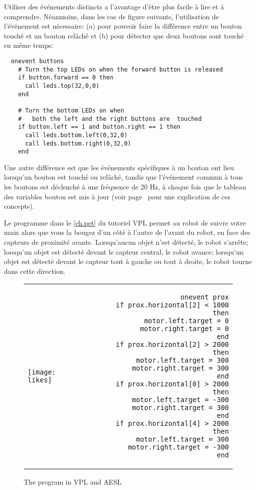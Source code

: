 Utiliser des événements distincts a l'avantage d'être plus facile à lire et à comprendre.
Néanmoins, dans les cas de figure suivants, l'utilisation de l'événement  est nécessaire:
(a) pour pouvoir faire la différence entre un bouton touché et un bouton relâché
et
(b) pour détecter que deux boutons sont touché en même temps:

\begin{footnotesize}
\begin{verbatim}
  onevent buttons
    # Turn the top LEDs on when the forward button is released
    if button.forward == 0 then
      call leds.top(32,0,0)
    end

    # Turn the bottom LEDs on when
    #   both the left and the right buttons are  touched
    if button.left == 1 and button.right == 1 then
      call leds.bottom.left(0,32,0)
      call leds.bottom.right(0,32,0)
    end
\end{verbatim}
\end{footnotesize}

Une autre différence est que les événements spécifiques à un bouton
ont lieu lorsqu'un bouton est touché ou relâché,
tandis que l'événement commun à tous les boutons est déclenché à une fréquence de 20 Hz,
à chaque fois que le tableau des variables bouton est mis à jour (voir page~\pageref{pg.hz}
pour une explication de ces concepts).


Le programme  dans le \cref{ch.pet} du tutoriel VPL
permet au robot de suivre votre main alors que vous la bougez d'un côté à l'autre de l'avant du robot,
en face des capteurs de proximité avants.
Lorsqu'aucun objet n'est détecté, le robot s'arrête;
lorsqu'un objet est détecté devant le capteur central, le robot avance;
lorsqu'un objet est détecté devant le capteur tout à gauche ou tout à droite,
le robot tourne dans cette direction.

\begin{figure}[hbt]
\begin{center}
\begin{tabular}{lr}
\texttt{[image: likes]} &
\begin{minipage}[b]{.4\textwidth}
\begin{footnotesize}
\begin{verbatim}
  onevent prox
    if prox.horizontal[2] < 1000 then
      motor.left.target = 0
      motor.right.target = 0
    end
    if prox.horizontal[2] > 2000 then
      motor.left.target = 300
      motor.right.target = 300
    end
    if prox.horizontal[0] > 2000 then
      motor.left.target = -300
      motor.right.target = 300
    end
    if prox.horizontal[4] > 2000 then
      motor.left.target = 300
      motor.right.target = -300
    end
\end{verbatim}
\end{footnotesize}
\end{minipage}
\end{tabular}
\caption{The  program in VPL and AESL}\label{fig.arrays}
\end{center}
\end{figure}


